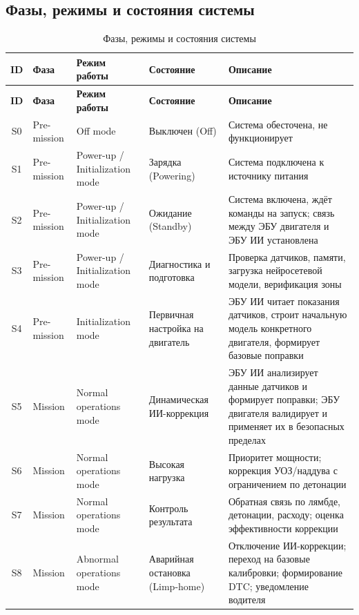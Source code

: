 \documentclass[14pt, a4paper]{extarticle}
\begin{document}
				\subsection{Фазы, режимы и состояния системы}
					{\fontsize{9}{11}\selectfont
						\begin{xltabular}{\textwidth}{|c|L|L|L|L|}
						\caption{Фазы, режимы и состояния системы}\label{tab:modes}\\
						\hline
						\textbf{ID} & \textbf{Фаза} & \textbf{Режим работы} & \textbf{Состояние} & \textbf{Описание} \\
						\hline
						\endfirsthead
						\hline
						\textbf{ID} & \textbf{Фаза} & \textbf{Режим работы} & \textbf{Состояние} & \textbf{Описание} \\
						\hline
						\endhead
						\hline
						\endfoot
						\hline
						\endlastfoot
						S0 & Pre-mission & Off mode & Выключен (Off) & Система обесточена, не функционирует \\
						\hline
						S1 & Pre-mission & Power-up / Initialization mode & Зарядка (Powering) & Система подключена к источнику питания \\
						\hline
						S2 & Pre-mission & Power-up / Initialization mode & Ожидание (Standby) & Система включена, ждёт команды на запуск; связь между ЭБУ двигателя и ЭБУ ИИ установлена \\
						\hline
						S3 & Pre-mission & Power-up / Initialization mode & Диагностика и подготовка & Проверка датчиков, памяти, загрузка нейросетевой модели, верификация зоны \\
						\hline
						S4 & Pre-mission & Initialization mode & Первичная настройка на двигатель & ЭБУ ИИ читает показания датчиков, строит начальную модель конкретного двигателя, формирует базовые поправки \\
						\hline
						S5 & Mission & Normal operations mode & Динамическая ИИ-коррекция & ЭБУ ИИ анализирует данные датчиков и формирует поправки; ЭБУ двигателя валидирует и применяет их в безопасных пределах \\
						\hline
						S6 & Mission & Normal operations mode & Высокая нагрузка & Приоритет мощности; коррекция УОЗ/наддува с ограничением по детонации \\
						\hline
						S7 & Mission & Normal operations mode & Контроль результата & Обратная связь по лямбде, детонации, расходу; оценка эффективности коррекции \\
						\hline
						S8 & Mission & Abnormal operations mode & Аварийная остановка (Limp-home) & Отключение ИИ-коррекции; переход на базовые калибровки; формирование DTC; уведомление водителя \\

\end{xltabular}}
\end{document}
